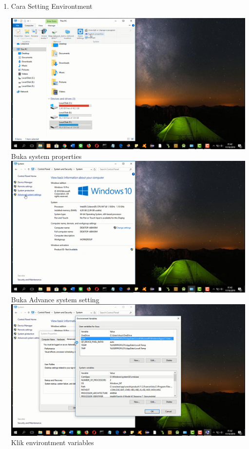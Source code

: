 \begin{enumerate}
\item Cara Setting Environtment

\includegraphics{gambar/ev_1.png}
Buka system properties\\

\includegraphics{gambar/ev_2.png}
Buka Advance system setting\\

\includegraphics{gambar/ev_3.png}
Klik environtment variables\\


\end{enumerate}
